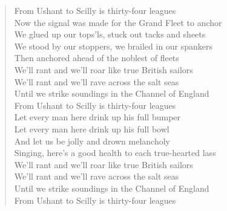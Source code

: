 \documentclass[11pt]{article}
\begin{document}
\begin{verse}
From Ushant to Scilly is thirty-four leagues\\
\vspace*{1em}
Now the signal was made for the Grand Fleet to anchor\\
We glued up our tops’ls, stuck out tacks and sheets\\
We stood by our stoppers, we brailed in our spankers\\
Then anchored ahead of the noblest of fleets\\
\vspace*{1em}
We’ll rant and we’ll roar like true British sailors\\
We’ll rant and we’ll rave across the salt seas\\
Until we strike soundings in the Channel of England\\
From Ushant to Scilly is thirty-four leagues\\
\vspace*{1em}
Let every man here drink up his full bumper\\
Let every man here drink up his full bowl\\
And let us be jolly and drown melancholy\\
Singing, here’s a good health to each true-hearted lass\\
We’ll rant and we’ll roar like true British sailors\\
We’ll rant and we’ll rave across the salt seas\\
Until we strike soundings in the Channel of England\\
From Ushant to Scilly is thirty-four leagues\\
\end{verse}
\clearpage
\end{document}
